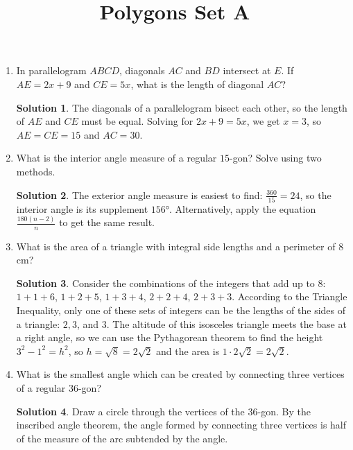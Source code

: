 \documentclass{article}
\title{Polygons Set A}
\author{}
\date{}
\theoremstyle{definition}
\newtheorem*{solution}{Solution}
\begin{document}
\maketitle

\begin{multicols}{2}
    \begin{enumerate}
        \item In parallelogram $ABCD$, diagonals $AC$ and $BD$ intersect at $E$.
            If $AE = 2x + 9$ and $CE = 5x$, what is the length of diagonal $AC$?
            \begin{solution}
                The diagonals of a parallelogram bisect each other, so the length of $AE$ and $CE$ must be equal.
                Solving for $2x + 9 = 5x$, we get $x = 3$, so $AE = CE = 15$ and $AC = 30$.
            \end{solution}
        \item What is the interior angle measure of a regular $15$-gon?
            Solve using two methods.
            \begin{solution}
                The exterior angle measure is easiest to find: $\frac{360}{15} = 24$, so the interior angle is its supplement $\ang{156}$.
                Alternatively, apply the equation $\frac{180(n - 2)}{n}$ to get the same result.
            \end{solution}
        \item What is the area of a triangle with integral side lengths and a perimeter of $8$ cm?
            \begin{solution}
                Consider the combinations of the integers that add up to $8$: $1 + 1 + 6$, $1 + 2 + 5$, $1 + 3 + 4$, $2 + 2+ 4$, $2 + 3 + 3$.
                According to the Triangle Inequality, only one of these sets of integers can be the lengths of the sides of a triangle: $2, 3$, and $3$.
                The altitude of this isosceles triangle meets the base at a right angle, so we can use the Pythagorean theorem to find the height $3^2 -1^2 = h^2$, so $h = \sqrt{8} = 2\sqrt{2}$ and the area is $1 \cdot 2\sqrt{2} = 2\sqrt{2}$.
            \end{solution}
        \item What is the smallest angle which can be created by connecting three vertices of a regular $36$-gon?
            \begin{solution}
                Draw a circle through the vertices of the $36$-gon.
                By the inscribed angle theorem, the angle formed by connecting three vertices is half of the measure of the arc subtended by the angle.

\end{solution}
\end{enumerate}
\end{multicols}
\end{document}
